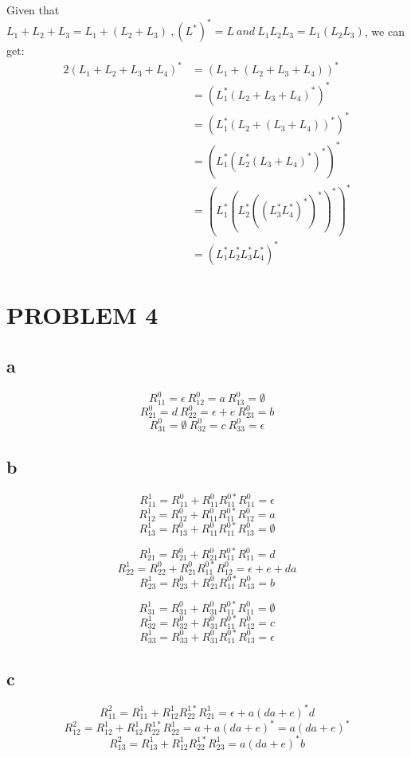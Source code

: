 \documentclass{ctexart}
\begin{document}
Given that $L_1+L_2+L_3=L_1+(L_2+L_3)\ ,(L^*)^*=L\ and\ L_1L_2L_3=L_1(L_2L_3) $, we can get:\\
\begin{alignat*}{2}
	(L_1+L_2+L_3+L_4)^* & =(L_1+(L_2+L_3+L_4))^*                \\
	                    & =(L_1^*(L_2+L_3+L_4)^*)^*             \\
	                    & =(L_1^*(L_2+(L_3+L_4))^*)^*           \\
	                    & =(L_1^*(L_2^*(L_3+L_4)^*)^*)^*        \\
	                    & =(L_1^*(L_2^*((L_3^*L_4^*)^*)^*)^*)^* \\
	                    & =(L_1^*L_2^*L_3^*L_4^*)^*
\end{alignat*}

\section{PROBLEM 4}
\subsection{a}
\[R_{11}^0 = \epsilon\ R_{12}^0=a\ R_{13}^0=\emptyset\]
\[R_{21}^0 = d\ R_{22}^0=\epsilon+e\ R_{23}^0=b\]
\[R_{31}^0 = \emptyset\ R_{32}^0=c\ R_{33}^0=\epsilon\]
\subsection{b}
\[R_{11}^1 = R_{11}^0 +R_{11}^0R_{11}^{0*}R_{11}^0 = \epsilon  \]
\[R_{12}^1 = R_{12}^0 +R_{11}^0R_{11}^{0*}R_{12}^0 = a  \]
\[R_{13}^1 = R_{13}^0 +R_{11}^0R_{11}^{0*}R_{13}^0 = \emptyset  \]

\[R_{21}^1 = R_{21}^0 +R_{21}^0R_{11}^{0*}R_{11}^0 = d  \]
\[R_{22}^1 = R_{22}^0 +R_{21}^0R_{11}^{0*}R_{12}^0 = \epsilon+e+da  \]
\[R_{23}^1 = R_{23}^0 +R_{21}^0R_{11}^{0*}R_{13}^0 = b  \]

\[R_{31}^1 = R_{31}^0 +R_{31}^0R_{11}^{0*}R_{11}^0 = \emptyset  \]
\[R_{32}^1 = R_{32}^0 +R_{31}^0R_{11}^{0*}R_{12}^0 = c  \]
\[R_{33}^1 = R_{33}^0 +R_{31}^0R_{11}^{0*}R_{13}^0 = \epsilon  \]

\subsection{c}
\[R_{11}^2 = R_{11}^1 +R_{12}^1R_{22}^{1*}R_{21}^1 = \epsilon+a(da+e)^*d  \]
\[R_{12}^2 = R_{12}^1 +R_{12}^1R_{22}^{1*}R_{22}^1 = a+a(da+e)^*=a(da+e)^*  \]
\[R_{13}^2 = R_{13}^1 +R_{12}^1R_{22}^{1*}R_{23}^1 = a(da+e)^*b  \]
\end{document}

